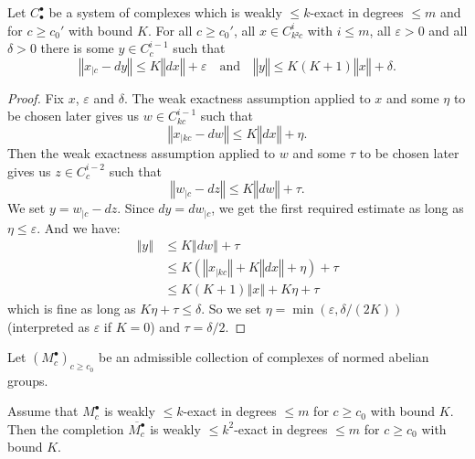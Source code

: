 \begin{lemma}
  \label{is_weak_bdd_exact_controlled_y}
  Let $C_\bullet^\bullet$ be a system of complexes which is
  weakly $\leq k$-exact in degrees $\leq m$ and for $c\geq c_0'$ with bound $K$.
  For all $c\geq c_0'$, all $x\in C_{k²c}^i$ with $i\leq m$, all $ε > 0$ and all $δ > 0$
  there is some $y\in C_c^{i-1}$ such that
  \[
    ‖x_{|c} - dy‖ ≤  K ‖dx‖ + ε
    \quad \text{and} \quad
    ‖y‖ ≤ K(K + 1)‖x‖ + δ.
  \]
\end{lemma}

\begin{proof}
  Fix $x$, $ε$ and $δ$. The weak exactness assumption applied to $x$ and some $η$ to be chosen later gives us
  $w ∈ C_{kc}^{i-1}$ such that
  \[
    ‖x_{|kc} - dw‖ ≤  K ‖dx‖ + η.
  \]
  Then the weak exactness assumption applied to $w$ and some $τ$ to be chosen later gives us
  $z ∈ C_{c}^{i-2}$ such that
  \[
    ‖w_{|c} - dz‖ ≤  K ‖dw‖ + τ.
  \]
  We set $y = w_{|c} - dz$. Since $dy = dw_{|c}$, we get the first required estimate as long
  as $η ≤ ε$. And we have:
  \begin{align*}
    ‖y‖ &≤ K ‖dw‖ + τ \\
        &≤ K (‖x_{|kc}‖ + K‖dx‖ + η) + τ \\
        &≤ K(K + 1) ‖x‖ + Kη + τ
  \end{align*}
  which is fine as long as $Kη + τ ≤ δ$.
  So we set $η = \min(ε, δ/(2K))$ (interpreted as $ε$ if $K=0$) and $τ = δ/2$.
\end{proof}

\begin{lemma}
  \label{completion_is_weakexact}
  Let $(M_c^\bullet)_{c\geq c_0}$ be an admissible collection
  of complexes of normed abelian groups.

  Assume that $M^\bullet_c$ is weakly $\leq k$-exact in degrees $\leq m$ for $c\geq c_0$ with bound $K$.
  Then the completion $\overline{M^\bullet_c}$ is weakly $\leq k^2$-exact in degrees $\leq m$ for $c\geq c_0$ with bound $K$.
\end{lemma}

